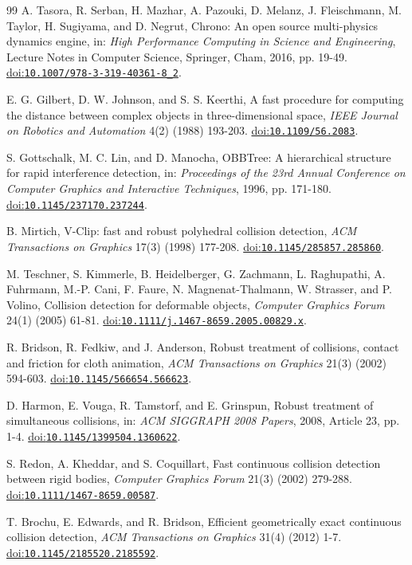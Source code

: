 \documentclass[preprint,12pt]{elsarticle}
\newcommand{\doi}[1]{\href{https://doi.org/#1}{doi:\nolinkurl{#1}}}
\begin{document}
\begin{thebibliography}{99}
A. Tasora, R. Serban, H. Mazhar, A. Pazouki, D. Melanz, J. Fleischmann, M. Taylor, H. Sugiyama, and D. Negrut, Chrono: An open source multi-physics dynamics engine, in: \emph{High Performance Computing in Science and Engineering}, Lecture Notes in Computer Science, Springer, Cham, 2016, pp. 19-49. \doi{10.1007/978-3-319-40361-8_2}.

E. G. Gilbert, D. W. Johnson, and S. S. Keerthi, A fast procedure for computing the distance between complex objects in three-dimensional space, \emph{IEEE Journal on Robotics and Automation} 4(2) (1988) 193-203. \doi{10.1109/56.2083}.

S. Gottschalk, M. C. Lin, and D. Manocha, OBBTree: A hierarchical structure for rapid interference detection, in: \emph{Proceedings of the 23rd Annual Conference on Computer Graphics and Interactive Techniques}, 1996, pp. 171-180. \doi{10.1145/237170.237244}.

B. Mirtich, V-Clip: fast and robust polyhedral collision detection, \emph{ACM Transactions on Graphics} 17(3) (1998) 177-208. \doi{10.1145/285857.285860}.

M. Teschner, S. Kimmerle, B. Heidelberger, G. Zachmann, L. Raghupathi, A. Fuhrmann, M.-P. Cani, F. Faure, N. Magnenat-Thalmann, W. Strasser, and P. Volino, Collision detection for deformable objects, \emph{Computer Graphics Forum} 24(1) (2005) 61-81. \doi{10.1111/j.1467-8659.2005.00829.x}.

R. Bridson, R. Fedkiw, and J. Anderson, Robust treatment of collisions, contact and friction for cloth animation, \emph{ACM Transactions on Graphics} 21(3) (2002) 594-603. \doi{10.1145/566654.566623}.

D. Harmon, E. Vouga, R. Tamstorf, and E. Grinspun, Robust treatment of simultaneous collisions, in: \emph{ACM SIGGRAPH 2008 Papers}, 2008, Article 23, pp. 1-4. \doi{10.1145/1399504.1360622}.

S. Redon, A. Kheddar, and S. Coquillart, Fast continuous collision detection between rigid bodies, \emph{Computer Graphics Forum} 21(3) (2002) 279-288. \doi{10.1111/1467-8659.00587}.

T. Brochu, E. Edwards, and R. Bridson, Efficient geometrically exact continuous collision detection, \emph{ACM Transactions on Graphics} 31(4) (2012) 1-7. \doi{10.1145/2185520.2185592}.


\end{thebibliography}
\end{document}
